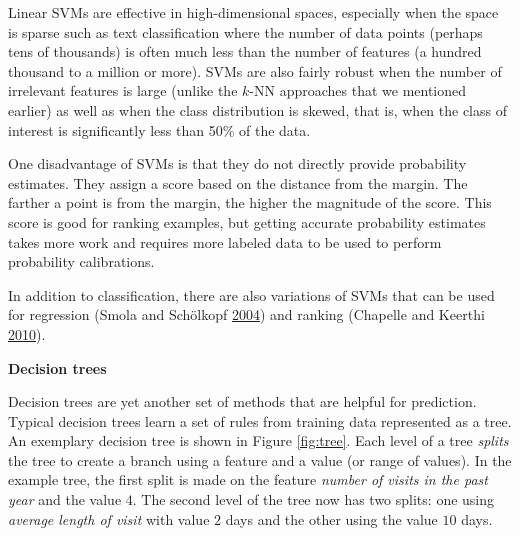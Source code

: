\documentclass[]{krantz}
\begin{document}
Linear SVMs are effective in high-dimensional spaces, especially when
the space is sparse such as text classification where the number of data
points (perhaps tens of thousands) is often much less than the number of
features (a hundred thousand to a million or more). SVMs are also fairly
robust when the number of irrelevant features is large (unlike the
\(k\)-NN approaches that we mentioned earlier) as well as when the class
distribution is skewed, that is, when the class of interest is
significantly less than 50\% of the data.

One disadvantage of SVMs is that they do not directly provide
probability estimates. They assign a score based on the distance from
the margin. The farther a point is from the margin, the higher the
magnitude of the score. This score is good for ranking examples, but
getting accurate probability estimates takes more work and requires more
labeled data to be used to perform probability calibrations.

In addition to classification, there are also variations of SVMs that
can be used for regression (Smola and Schölkopf
\protect\hyperlink{ref-SmolaRegression04}{2004}) and ranking (Chapelle
and Keerthi \protect\hyperlink{ref-Chapelle2010}{2010}).

\textbf{Decision trees}

Decision trees are yet another set of methods that are helpful for
prediction. Typical decision trees learn a set of rules from training
data represented as a tree. An exemplary decision tree is shown in
Figure \ref{fig:tree}. Each level of a tree \emph{splits} the tree to
create a branch using a feature and a value (or range of values). In the
example tree, the first split is made on the feature \emph{number of
visits in the past year} and the value \(4\). The second level of the
tree now has two splits: one using \emph{average length of visit} with
value \(2\) days and the other using the value \(10\) days.
\end{document}
